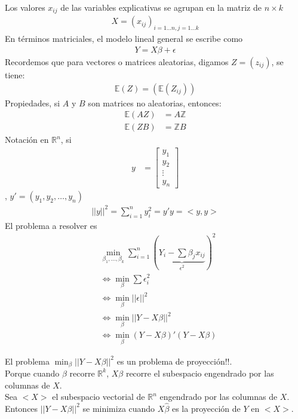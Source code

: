 \documentclass[10pt]{article}
\theoremstyle{plain}
\theoremstyle{definition}
\begin{document}
  Los valores $x_{ij}$ de las variables explicativas se agrupan en la matriz de $n\times k$
  \begin{align*}
  X = (x_{ij})_{i=1\ldots n, j=1\ldots k}
  \end{align*}
  En términos matriciales, el modelo lineal general se escribe como
  \begin{align*}
  Y = X \beta + \epsilon
  \end{align*}
  Recordemos que para vectores o matrices aleatorias, digamos $Z = (z_{ij})$, se tiene:
  \begin{align*}
  \mathbb{E}(Z) = (\mathbb{E}(Z_{ij}))
  \end{align*}
  Propiedades, si $A$ y $B$ son matrices no aleatorias, entonces:
  \begin{align*}
  \mathbb{E}(AZ) &= A \mathbb{Z}\\
  \mathbb{E}(ZB) &= \mathbb{Z} B
  \end{align*}
  Notación en $\mathbb{R}^n$, si
 \begin{align*}
    y &= \begin{bmatrix}
           y_{1} \\
           y_{2} \\
           \vdots \\
           y_{n}
         \end{bmatrix}
  \end{align*}
, $y' = (y_{1},y_{2},\ldots, y_{n})$\\
\begin{align*}
||y||^2 = \sum_{i=1}^n y_{i}^2 = y'y = <y,y>
\end{align*}  
El problema a resolver es
\begin{align*}
& \min_{\beta_{1},\ldots, \beta_{k}} \sum_{i=1}^n (\underbrace{Y_{i}-\sum \beta_{j} x_{ij}}_{\epsilon^2})^2\\
& \Leftrightarrow \min_{\beta} \sum \epsilon_{i}^2\\
& \Leftrightarrow \min_{\beta} ||\epsilon||^2\\
& \Leftrightarrow \min_{\beta} ||Y-X\beta||^2\\
& \Leftrightarrow \min_{\beta} (Y-X\beta)'(Y-X\beta)
\end{align*}

El problema $\min_{\beta} ||Y-X\beta||^2$ es un problema de proyección!!.\\

Porque cuando $\beta$ recorre $\mathbb{R}^k$, $X\beta$ recorre el subespacio engendrado por las columnas de $X$.\\
Sea $<X>$ el subespacio vectorial de $\mathbb{R}^n$ engendrado por las columnas de $X$.\\
Entonces $||Y-X\beta||^2$ se minimiza cuando $X\hat{\beta}$ es la proyección de $Y$ en $<X>$.
\end{document}
